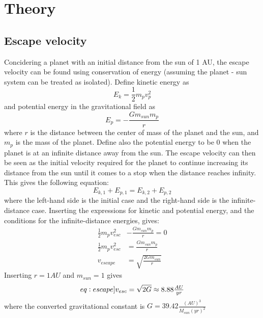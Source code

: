 \section{Theory}
\subsection{Escape velocity}
Concidering a planet with an initial distance from the sun of 1 AU, the escape velocity can be
found using conservation of energy (assuming the planet - sun system can be treated as isolated).
Define kinetic energy as
$$E_k = \frac{1}{2}m_{p}v_{p}^2$$
and potential energy in the gravitational field as
$$E_p = -\frac{Gm_{sun}m_{p}}{r}$$
where $r$ is the distance between the center of mass of the planet and the sun, and $m_p$ is the
mass of the planet. Define also the potential
energy to be 0 when the planet is at an infinite distance away from the sun. The escape velocity can
then be seen as the initial velocity required for the planet to continue increasing its distance from
the sun until it comes to a stop when the distance reaches infinity. This gives the following
equation:
\begin{equation*}
E_{k,1} + E_{p,1} = E_{k,2} + E_{p,2}
\end{equation*}
where the left-hand side is the initial case and the right-hand side is the infinite-distance
case. Inserting the expressions for kinetic and potential energy, and the conditions for the
infinite-distance energies, gives:
\begin{align*}
\tfrac{1}{2}m_{p}v_{esc}^2 &- \frac{Gm_{sun}m_{p}}{r} = 0 \\
\tfrac{1}{2}m_{p}v_{esc}^2 &= \frac{Gm_{sun}m_{p}}{r} \\
v_{escape} &= \sqrt{\tfrac{2Gm_{sun}}{r}}
\end{align*}
Inserting $r = 1AU$ and $m_{sun} = 1$ gives 
\begin{equation}\label[eq:escape]
v_{esc} = \sqrt{2G} \approx 8.88\tfrac{AU}{yr}
\end{equation}
where the converted gravitational constant is $G = 39.42 \frac{(AU)^3}{M_{sun}(yr)^2}$

